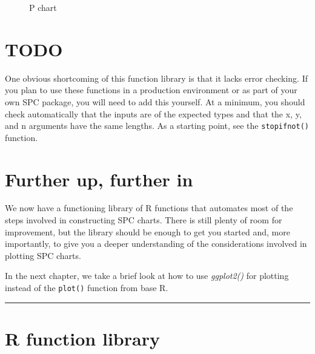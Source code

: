 \documentclass[
]{book}
\makeatletter
\newcommand*\pandocbounded[1]{%
  \sbox\pandoc@box{#1}%
  \Gscale@div\@tempa{\textheight}{\dimexpr\ht\pandoc@box+\dp\pandoc@box\relax}%
  \Gscale@div\@tempb{\linewidth}{\wd\pandoc@box}%
  \ifdim\@tempb\p@<\@tempa\p@\let\@tempa\@tempb\fi%
  \ifdim\@tempa\p@<\p@\scalebox{\@tempa}{\usebox\pandoc@box}%
  \else\usebox{\pandoc@box}%
  \fi%
}
\makeatother
\begin{document}
\begin{figure}
\centering
\pandocbounded{}
\caption{P chart}
\end{figure}

\section{TODO}\label{todo}

One obvious shortcoming of this function library is that it lacks error
checking. If you plan to use these functions in a production environment
or as part of your own SPC package, you will need to add this yourself.
At a minimum, you should check automatically that the inputs are of the
expected types and that the x, y, and n arguments have the same lengths.
As a starting point, see the \texttt{stopifnot()} function.

\section{Further up, further in}\label{further-up-further-in}

We now have a functioning library of R functions that automates most of
the steps involved in constructing SPC charts. There is still plenty of
room for improvement, but the library should be enough to get you
started and, more importantly, to give you a deeper understanding of the
considerations involved in plotting SPC charts.

In the next chapter, we take a brief look at how to use \emph{ggplot2()}
for plotting instead of the \texttt{plot()} function from base R.

\begin{center}\rule{0.5\linewidth}{0.5pt}\end{center}

\section*{R function library}\label{funs}
\end{document}
